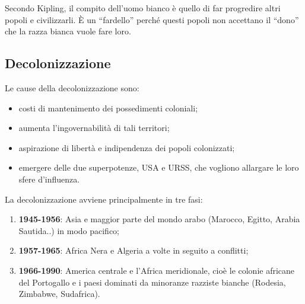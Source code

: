 \documentclass[a4paper]{article}
\newcommand{\quotes}[1]{``#1''}
\begin{document}


Secondo Kipling, il compito dell'uomo bianco è quello di far progredire
altri popoli e civilizzarli. È un \quotes{fardello}
perché questi popoli non accettano il \quotes{dono} che la razza bianca vuole fare loro.


\pagebreak

\subsection{Decolonizzazione}


Le cause della decolonizzazione sono:
\begin{itemize}
    \item costi di mantenimento dei possedimenti coloniali;
    \item aumenta l'ingovernabilità di tali territori;
    \item aspirazione di libertà e indipendenza dei popoli colonizzati;
    \item emergere delle due superpotenze, USA e URSS, che vogliono
    allargare le loro sfere d'influenza.
\end{itemize}

La decolonizzazione avviene principalmente in tre fasi:

\begin{enumerate}
    \item \textbf{1945-1956}: Asia e maggior parte del mondo arabo (Marocco, Egitto, Arabia Sautida..) in modo pacifico;
    \item \textbf{1957-1965}: Africa Nera e Algeria a volte in seguito a conflitti;
    \item \textbf{1966-1990}: America centrale e l'Africa meridionale, cioè le colonie africane del Portogallo e i
    paesi dominati da minoranze razziste bianche (Rodesia, Zimbabwe, Sudafrica).
\end{enumerate}
\end{document}
